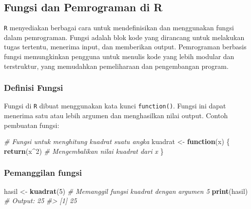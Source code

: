 \documentclass[
  oneside]{book}
\newenvironment{Shaded}{\begin{snugshade}}{\end{snugshade}}
\newcommand{\CommentTok}[1]{\textcolor[rgb]{0.56,0.35,0.01}{\textit{#1}}}
\newcommand{\ControlFlowTok}[1]{\textcolor[rgb]{0.13,0.29,0.53}{\textbf{#1}}}
\newcommand{\DecValTok}[1]{\textcolor[rgb]{0.00,0.00,0.81}{#1}}
\newcommand{\FunctionTok}[1]{\textcolor[rgb]{0.13,0.29,0.53}{\textbf{#1}}}
\newcommand{\NormalTok}[1]{#1}
\newcommand{\OtherTok}[1]{\textcolor[rgb]{0.56,0.35,0.01}{#1}}
\newcommand{\SpecialCharTok}[1]{\textcolor[rgb]{0.81,0.36,0.00}{\textbf{#1}}}
\begin{document}
\subsection*{Fungsi dan Pemrograman di R}\label{fungsi-dan-pemrograman-di-r}

\texttt{R} menyediakan berbagai cara untuk mendefinisikan dan menggunakan fungsi dalam pemrograman. Fungsi adalah blok kode yang dirancang untuk melakukan tugas tertentu, menerima input, dan memberikan output. Pemrograman berbasis fungsi memungkinkan pengguna untuk menulis kode yang lebih modular dan terstruktur, yang memudahkan pemeliharaan dan pengembangan program.

\subsubsection*{Definisi Fungsi}\label{definisi-fungsi}

Fungsi di \texttt{R} dibuat menggunakan kata kunci \texttt{function()}. Fungsi ini dapat menerima satu atau lebih argumen dan menghasilkan nilai output. Contoh pembuatan fungsi:

\begin{Shaded}
\begin{Highlighting}[]
\CommentTok{\# Fungsi untuk menghitung kuadrat suatu angka}
\NormalTok{kuadrat }\OtherTok{\textless{}{-}} \ControlFlowTok{function}\NormalTok{(x) \{}
  \FunctionTok{return}\NormalTok{(x}\SpecialCharTok{\^{}}\DecValTok{2}\NormalTok{)   }\CommentTok{\# Mengembalikan nilai kuadrat dari x}
\NormalTok{\}}
\end{Highlighting}
\end{Shaded}

\subsubsection*{Pemanggilan fungsi}\label{pemanggilan-fungsi}

\begin{Shaded}
\begin{Highlighting}[]
\NormalTok{hasil }\OtherTok{\textless{}{-}} \FunctionTok{kuadrat}\NormalTok{(}\DecValTok{5}\NormalTok{)  }\CommentTok{\# Memanggil fungsi \textquotesingle{}kuadrat\textquotesingle{} dengan argumen 5}
\FunctionTok{print}\NormalTok{(hasil)          }\CommentTok{\# Output: 25}
\CommentTok{\#\textgreater{} [1] 25}
\end{Highlighting}
\end{Shaded}
\end{document}
